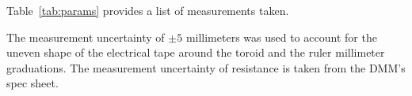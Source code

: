Table~\ref{tab:params} provides a list of measurements taken.

The measurement uncertainty of $\pm 5$ millimeters was used to account for the uneven shape of the electrical tape
around the toroid and the ruler millimeter graduations.
The measurement uncertainty of resistance is taken from the DMM's spec sheet.